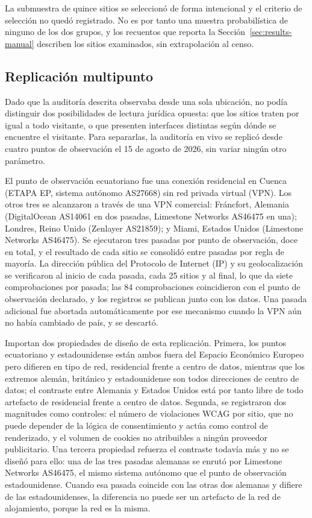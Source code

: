 \documentclass[pdflatex,sn-basic,Numbered,iicol]{sn-jnl}
\theoremstyle{thmstyleone}
\theoremstyle{thmstyletwo}
\theoremstyle{thmstylethree}
\begin{document}
La submuestra de quince sitios se seleccion\'o de forma intencional y el criterio de selecci\'on no qued\'o registrado. No es por tanto una muestra probabil\'istica de ninguno de los dos grupos, y los recuentos que reporta la Secci\'on~\ref{sec:results-manual} describen los sitios examinados, sin extrapolaci\'on al censo.

\subsection{Replicaci\'on multipunto}\label{sec:methods-vantage}

Dado que la auditor\'ia descrita observaba desde una sola ubicaci\'on, no pod\'ia distinguir dos posibilidades de lectura jur\'idica opuesta: que los sitios traten por igual a todo visitante, o que presenten interfaces distintas seg\'un d\'onde se encuentre el visitante. Para separarlas, la auditor\'ia en vivo se replic\'o desde cuatro puntos de observaci\'on el 15 de agosto de 2026, sin variar ning\'un otro par\'ametro.

El punto de observaci\'on ecuatoriano fue una conexi\'on residencial en Cuenca (ETAPA EP, sistema aut\'onomo AS27668) sin red privada virtual (VPN). Los otros tres se alcanzaron a trav\'es de una VPN comercial: Fr\'ancfort, Alemania (DigitalOcean AS14061 en dos pasadas, Limestone Networks AS46475 en una); Londres, Reino Unido (Zenlayer AS21859); y Miami, Estados Unidos (Limestone Networks AS46475). Se ejecutaron tres pasadas por punto de observaci\'on, doce en total, y el resultado de cada sitio se consolid\'o entre pasadas por regla de mayor\'ia. La direcci\'on p\'ublica del Protocolo de Internet (IP) y su geolocalizaci\'on se verificaron al inicio de cada pasada, cada 25 sitios y al final, lo que da siete comprobaciones por pasada; las 84 comprobaciones coincidieron con el punto de observaci\'on declarado, y los registros se publican junto con los datos. Una pasada adicional fue abortada autom\'aticamente por ese mecanismo cuando la VPN a\'un no hab\'ia cambiado de pa\'is, y se descart\'o.

Importan dos propiedades de dise\~no de esta replicaci\'on. Primera, los puntos ecuatoriano y estadounidense est\'an ambos fuera del Espacio Econ\'omico Europeo pero difieren en tipo de red, residencial frente a centro de datos, mientras que los extremos alem\'an, brit\'anico y estadounidense son todos direcciones de centro de datos; el contraste entre Alemania y Estados Unidos est\'a por tanto libre de todo artefacto de residencial frente a centro de datos. Segunda, se registraron dos magnitudes como controles: el n\'umero de violaciones WCAG por sitio, que no puede depender de la l\'ogica de consentimiento y act\'ua como control de renderizado, y el volumen de cookies no atribuibles a ning\'un proveedor publicitario. Una tercera propiedad refuerza el contraste todav\'ia m\'as y no se dise\~n\'o para ello: una de las tres pasadas alemanas se enrut\'o por Limestone Networks AS46475, el mismo sistema aut\'onomo que el punto de observaci\'on estadounidense. Cuando esa pasada coincide con las otras dos alemanas y difiere de las estadounidenses, la diferencia no puede ser un artefacto de la red de alojamiento, porque la red es la misma.
\end{document}
